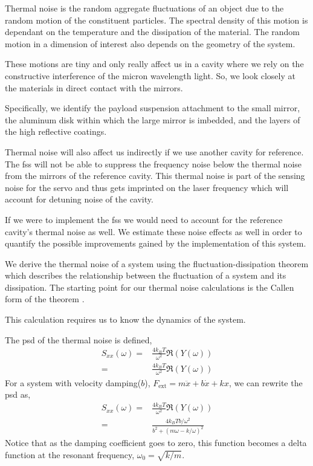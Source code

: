 Thermal noise is the random aggregate fluctuations of an object due to the
random motion of the constituent particles.
The spectral density of this motion is dependant on the temperature and the
dissipation of the material.
The random motion in a dimension of interest also depends on the geometry of
the system.

These motions are tiny and only really affect us in a cavity where we rely on
the constructive interference of the micron wavelength light.
So, we look closely at the materials in direct contact with the mirrors.

Specifically, we identify the payload suspension attachment to the small
mirror, the aluminum disk within which the large mirror is imbedded, and the
layers of the high reflective coatings.

Thermal noise will also affect us indirectly if we use another cavity for
reference.
The \ac{fss} will not be able to suppress the frequency noise below the
thermal noise from the mirrors of the reference cavity.
This thermal noise is part of the sensing noise for the servo and thus gets
imprinted on the laser frequency which will account for detuning noise of
the cavity.

If we were to implement the \ac{fss} we would need to account for the
reference cavity's thermal noise as well.
We estimate these noise effects as well in order to quantify the possible
improvements gained by the implementation of this system.

We derive the thermal noise of a system using the fluctuation-dissipation
theorem which describes the relationship between the fluctuation of a system
and its dissipation.
The starting point for our thermal noise calculations
is the Callen form of the theorem \cite{Saulson,Callen}.

This calculation requires us to know the dynamics of the system.

The \ac{psd} of the thermal noise is defined,
\begin{align}
S_{xx}(\omega) =& \frac{4 k_B T}{\omega^2} \Re (Y(\omega)) \\
    =& \frac{4 k_B T}{\omega^2} \Re (Y(\omega))
\end{align}
For a system with velocity damping($b$), $F_{\mathrm{ext}} = m\ddot{x} + b\dot{x} + kx$,
we can rewrite the \ac{psd} as,
\begin{align}
S_{xx}(\omega) =& \frac{4 k_B T}{\omega^2} \Re (Y(\omega)) \\
    =& \frac{4 k_B T b / \omega^2}{ b^2 + (m \omega - k/\omega)^2}
\end{align}
Notice that as the damping coefficient goes to zero, this function becomes a
delta function at the resonant frequency, $\omega_0 = \sqrt{k/m}$.

